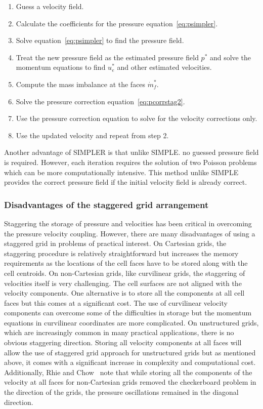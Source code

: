 \begin{enumerate}
\item Guess a velocity field. 
\item Calculate the coefficients for the pressure equation~\ref{eq:psimpler}.
\item Solve equation~\ref{eq:psimpler} to find the pressure field.
\item Treat the new pressure field as the estimated pressure field $p^{\ast}$ and solve the momentum equations to find $u_e^{\ast}$ and other estimated velocities.
\item Compute the mass imbalance at the faces $\dot{m}_f^{\ast}$.
\item Solve the pressure correction equation~\ref{eq:pcorrstag2}.
\item Use the pressure correction equation to solve for the velocity corrections only.
\item Use the updated velocity and repeat from step 2.
\end{enumerate}
Another advantage of SIMPLER is that unlike SIMPLE. no guessed pressure field is required. However, each iteration requires the solution of two Poisson problems which can be more computationally intensive. This method unlike SIMPLE provides the correct pressure field if the initial velocity field is already correct.


\subsubsection{Disadvantages of the staggered grid arrangement}
Staggering the storage of pressure and velocities has been critical in overcoming the pressure velocity coupling. However, there are many disadvantages of using a staggered grid in problems of practical interest. On Cartesian grids, the staggering procedure is relatively straightforward but increases the memory requirements as the locations of the cell faces have to be stored along with the cell centroids. On non-Cartesian grids, like curvilinear grids, the staggering of velocities itself is very challenging. The cell surfaces are not aligned with the velocity components. One alternative is to store all the components at all cell faces but this comes at a significant cost. The use of curvilinear velocity components can overcome some of the difficulties in storage but the momentum equations in curvilinear coordinates are more complicated. On unstructured grids, which are increasingly common in many practical applications, there is no obvious staggering direction. Storing all velocity components at all faces will allow the use of staggered grid approach for unstructured grids but as mentioned above, it comes with a significant increase in complexity and computational cost. Additionally, Rhie and Chow~\cite{Rhie1983} note that while storing all the components of the velocity at all faces for non-Cartesian grids removed the checkerboard problem in the direction of the grids, the pressure oscillations remained in the diagonal direction.

